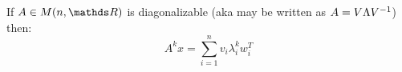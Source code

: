 \documentclass[ComputationalMathematics.tex]{subfiles}
\begin{document}

\begin{proposition}
  If $A \in M(n, \R)$ is diagonalizable (aka may be written as $A = V \Lambda {V}^{-1}$) 
  then:
  $$A^k x = \sum\limits_{i=1}^{n} v_i\lambda^k_i w_i^T$$
\end{proposition}
\end{document}
